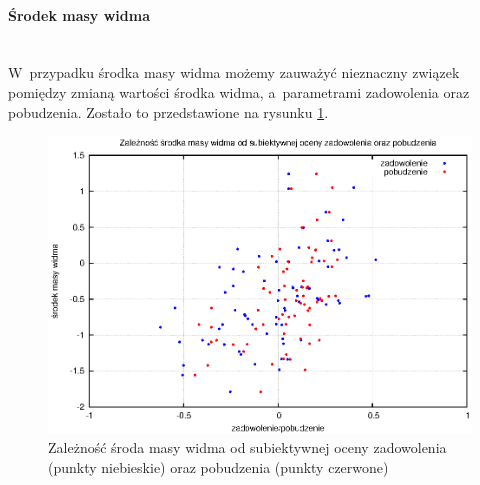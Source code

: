 \paragraph{Środek masy widma}\mbox{}\\
W~przypadku środka masy widma możemy zauważyć nieznaczny związek pomiędzy zmianą wartości środka widma, a~parametrami zadowolenia oraz pobudzenia. Zostało to przedstawione na rysunku \ref{wykresCentroid}.
\begin{figure}[ht!]
\centering
\includegraphics[scale=\imageSize]{res/centroid.eps}
\caption{Zależność środa masy widma od subiektywnej oceny zadowolenia (punkty niebieskie) oraz pobudzenia (punkty czerwone)\label{wykresCentroid}}
\end{figure}
